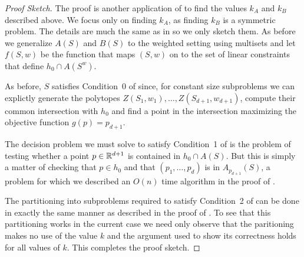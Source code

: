 \documentclass[lotsofwhite]{patmorin}
\begin{document}
\begin{proof}[Proof Sketch]
The proof is another application of  to find the values
$k_A$ and $k_B$ described above.  We focus only on finding $k_A$, as
finding $k_B$ is a symmetric problem.  The details are much the same
as in  so we only sketch them.  As before we
generalize $A(S)$ and $B(S)$ to the weighted setting using multisets
and let $f(S,w)$ be the function that maps $(S,w)$ on to the set of
linear constraints that define $h_0\cap A(S^w)$.

As before, $S$ satisfies Condition~0 of  since, for
constant size subproblems we can explictly generate the polytopes
$Z(S_1,w_1),\ldots,Z(S_{d+1},w_{d+1})$, compute their common
intersection with $h_0$ and find a point in the intersection
maximizing the objective function $g(p)=p_{d+1}$. 

The decision problem we must solve to satisfy Condition~1 of
 is the problem of testing whether a point $p\in
\mathbb{R}^{d+1}$ is contained in $h_0\cap A(S)$.  But this is simply a matter
of checking that $p\in h_0$ and that $(p_1,\ldots,p_d)$ is in
$A_{p_{d+1}}(S)$, a problem for which we described an $O(n)$ time
algorithm in the proof of .

The partitioning into subproblems required to satisfy Condition~2 of
 can be done in exactly the same manner as described in
the proof of .  To see that this partitioning works
in the current case we need only observe that the paritioning makes no
use of the value $k$ and the argument used to show its correctness
holds for all values of $k$.  This completes the proof sketch.
\end{proof}



\end{document}
